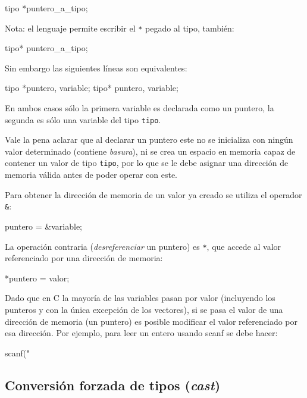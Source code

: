 \begin{codigo-c-plano}
tipo *puntero_a_tipo;
\end{codigo-c-plano}

Nota: el lenguaje permite escribir el \lstinline!*! pegado al tipo, también:

\begin{codigo-c-plano}
tipo* puntero_a_tipo;
\end{codigo-c-plano}

Sin embargo las siguientes líneas son equivalentes:

\begin{codigo-c-plano}
tipo *puntero, variable;
tipo* puntero, variable;
\end{codigo-c-plano}

En ambos casos sólo la primera variable es declarada como un puntero, la
segunda es sólo una variable del tipo \lstinline!tipo!.

Vale la pena aclarar que al declarar un puntero este no se inicializa con
ningún valor determinado (contiene \textit{basura}), ni se crea un espacio en
memoria capaz de contener un valor de tipo \lstinline!tipo!, por lo que se le
debe asignar una dirección de memoria válida antes de poder operar con este.

Para obtener la dirección de memoria de un valor ya creado se utiliza el
operador \lstinline!&!:

\begin{codigo-c-plano}
puntero = &variable;
\end{codigo-c-plano}

La operación contraria (\textit{desreferenciar} un puntero) es \lstinline!*!,
que accede al valor referenciado por una dirección de memoria:

\begin{codigo-c-plano}
*puntero = valor;
\end{codigo-c-plano}

Dado que en C la mayoría de las variables pasan por valor (incluyendo los
punteros y con la única excepción de los vectores), si se pasa el valor de una
dirección de memoria (un puntero) es posible modificar el valor referenciado
por esa dirección. Por ejemplo, para leer un entero usando scanf se debe hacer:

\begin{codigo-c-plano}
scanf("%
\end{codigo-c-plano}

\subsection{Conversión forzada de tipos (\textit{cast})}

